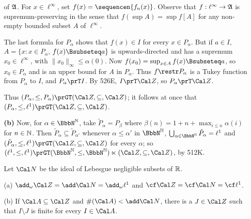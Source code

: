 {\noindent of $\frak A$.
For $x\in\ell^{\infty}$, set $f(x)=\sequencen{f_n(x)}$.
Observe that $f:\ell^{\infty}\to\frak A$ is supremum-preserving in the
sense that $f(\sup A)=\sup f[A]$ for any non-empty bounded subset $A$ of
$\ell^{\infty}$.

The last formula for $P_{\alpha}$ shows that $f(x)\in I$ for every
$x\in P_{\alpha}$.   But if $a\in I$,
$A=\{x:x\in P_{\alpha}$, $f(x)\Bsubseteq a\}$ is upwards-directed and
has a supremum $x_0\in\ell^{\infty}$, with $\|x_0\|_{\infty}\le
\alpha(0)$.   Now $f(x_0)=\sup_{x\in A}f(x)\Bsubseteq a$, so $x_0\in
P_{\alpha}$ and is an
upper bound for $A$ in $P_{\alpha}$.   Thus $f\restr P_{\alpha}$ is a
Tukey function from $P_{\alpha}$ to $I$, and $P_{\alpha}\prT I$.
By 526E, $I\prT\Cal Z$, so $P_{\alpha}\prT\Cal Z$.\ \Qed

Thus $(P_{\alpha},\le,P_{\alpha})\prGT(\Cal Z,\subseteq,\Cal Z)$;  it
follows at once that
$(P_{\alpha},\le,\ell^1)\prGT(\Cal Z,\subseteq,\Cal Z)$.

\medskip

{\bf (b)} Now, for $\alpha\in\NN$, take $\tilde P_\alpha=P_{\beta}$ where
$\beta(n)=1+n+\max_{i\le n}\alpha(i)$ for $n\in\Bbb N$.   Then
$\tilde P_{\alpha}\subseteq\tilde P_{\alpha'}$ whenever
$\alpha\le\alpha'$ in
$\NN$, $\bigcup_{\alpha\in\NN}\tilde P_\alpha=\ell^1$ and
$(\tilde P_\alpha,\le,\ell^1)\prGT(\Cal Z,\subseteq,\Cal Z)$ for every
$\alpha$;  so
$(\ell^1,\le,\ell^1)\prGT(\NN,\le,\NN)\ltimes(\Cal Z,\subseteq,\Cal Z)$,
by 512K.
}%

 Let $\Cal N$ be the ideal of Lebesgue
negligible subsets of $\Bbb R$.

(a) $\add_{\omega}\Cal Z=\add\Cal N=\add_{\omega}\ell^1$ and
$\cf\Cal Z=\cf\Cal N=\cf\ell^1$.

(b) If $\Cal A\subseteq\Cal Z$ and $\#(\Cal A)<\add\Cal N$, there is a
$J\in\Cal Z$ such that $I\setminus J$ is finite for every $I\in\Cal A$.


